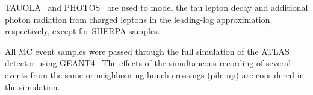 TAUOLA~\cite{TAUOLA} and PHOTOS~\cite{PHOTOS} are used to model the
tau lepton decay and additional photon radiation from charged leptons
in the leading-log approximation, respectively, except for SHERPA
samples.  

All MC event samples were passed through the full simulation
of the ATLAS detector using GEANT4~\cite{Geant4,ATLASSIM} 
The effects of the 
simultaneous recording of several events from the
same or neighbouring bunch crossings (pile-up) are considered in the
simulation. 


